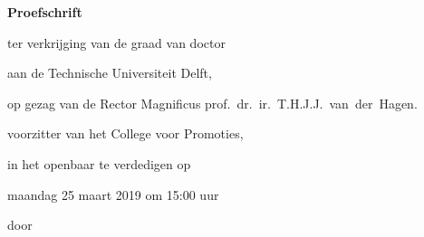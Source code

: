 \begin{titlepage}

\begin{center}

\vspace*{2\bigskipamount}

{\makeatletter
\titlestyle\bfseries\LARGE\@title
\makeatother}

{\makeatletter
\ifx\@subtitle\undefined\else
    \bigskip
    \titlefont\titleshape\Large\@subtitle
\fi
\makeatother}

\end{center}

\cleardoublepage
\thispagestyle{empty}

\begin{center}


\vspace*{2\bigskipamount}

{\makeatletter
\titlestyle\bfseries\LARGE\@title
\makeatother}

{\makeatletter
\ifx\@subtitle\undefined\else
    \bigskip
    \titlefont\titleshape\Large\@subtitle
\fi
\makeatother}

\vfill


{\Large\titlefont\bfseries Proefschrift}

\bigskip
\bigskip

ter verkrijging van de graad van doctor

aan de Technische Universiteit Delft,

op gezag van de Rector Magnificus prof.~dr.~ir.~T.H.J.J.~van~der~Hagen.

voorzitter van het College voor Promoties,

in het openbaar te verdedigen op

 maandag 25 maart 2019 om 15:00 uur

\bigskip
\bigskip

door

\bigskip
\bigskip

\makeatletter
{\Large\titlefont\bfseries\@firstname\ {\titleshape\@lastname}}
\makeatother


\end{center}
\end{titlepage}
